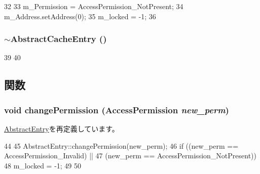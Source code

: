 \begin{DoxyCode}
32 {
33     m_Permission = AccessPermission_NotPresent;
34     m_Address.setAddress(0);
35     m_locked = -1;
36 }
\end{DoxyCode}
\hypertarget{classAbstractCacheEntry_a10ab46a60152e0b3e6668a6f1f9f52e5}{
\subsubsection[{$\sim$AbstractCacheEntry}]{\setlength{\rightskip}{0pt plus 5cm}$\sim${\bf AbstractCacheEntry} ()}}
\label{classAbstractCacheEntry_a10ab46a60152e0b3e6668a6f1f9f52e5}



\begin{DoxyCode}
39 {
40 }
\end{DoxyCode}


\subsection{関数}
\hypertarget{classAbstractCacheEntry_ac3f081af818286da737aac954875dd19}{
\subsubsection[{changePermission}]{\setlength{\rightskip}{0pt plus 5cm}void changePermission (AccessPermission {\em new\_\-perm})}}
\label{classAbstractCacheEntry_ac3f081af818286da737aac954875dd19}


\hyperlink{classAbstractEntry_ac3f081af818286da737aac954875dd19}{AbstractEntry}を再定義しています。


\begin{DoxyCode}
44 {
45     AbstractEntry::changePermission(new_perm);
46     if ((new_perm == AccessPermission_Invalid) ||
47         (new_perm == AccessPermission_NotPresent)) {
48         m_locked = -1;
49     }
50 }
\end{DoxyCode}


